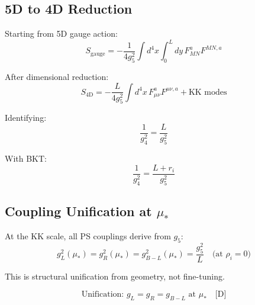 \documentclass[11pt,a4paper]{article}
\theoremstyle{definition}
\begin{document}
\subsection{5D to 4D Reduction}
\label{subsec:5d_4d}

Starting from 5D gauge action:
\begin{equation}
\label{eq:5d_action}
S_{\text{gauge}} = -\frac{1}{4g_5^2} \int d^4x \int_0^L dy \, F_{MN}^a F^{MN,a}
\end{equation}

After dimensional reduction:
\begin{equation}
\label{eq:4d_reduction}
S_{\text{4D}} = -\frac{L}{4g_5^2} \int d^4x \, F_{\mu\nu}^a F^{\mu\nu,a} + \text{KK modes}
\end{equation}

Identifying:
\begin{equation}
\label{eq:g4_identification}
\frac{1}{g_4^2} = \frac{L}{g_5^2}
\end{equation}

With BKT:
\begin{equation}
\label{eq:g4_bkt}
\frac{1}{g_4^2} = \frac{L + r_i}{g_5^2}
\end{equation}

\subsection{Coupling Unification at $\mu_*$}
\label{subsec:unification}

At the KK scale, all PS couplings derive from $g_5$:
\begin{equation}
\label{eq:unification_g5}
g_L^2(\mu_*) = g_R^2(\mu_*) = g_{B-L}^2(\mu_*) = \frac{g_5^2}{L} \quad \text{(at } \rho_i = 0\text{)}
\end{equation}

This is structural unification from geometry, not fine-tuning.

\begin{equation}
\label{eq:unification_check}
\text{Unification: } g_L = g_R = g_{B-L} \text{ at } \mu_* \quad \text{[D]}
\end{equation}

\end{document}
